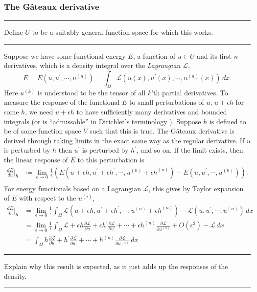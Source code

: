 \documentclass[11pt,a4paper]{memoir}
\newcommand{\pr}{\prime}
\newcommand{\fancyL}{\mathcal{L}}
\newcommand{\todo}[1]{\vskip 0.1in \hrule \vskip 0.03in {#1} \vskip 0.03in \hrule \vskip 0.1in}
\begin{document}
\subsubsection{The G\^ateaux derivative}
\todo{Define $U$ to be a suitably general function space for which this works.}

Suppose we have some functional energy $E$, a function of $u \in U$ and its first $n$ derivatives,
which is a density integral over the \textit{Lagrangian} $\fancyL$,
    $$E = E(u, u^\prime, \cdots, u^{(n)}) = \int_\Omega \fancyL(u(x),u^\prime(x),\cdots,u^{(n)}(x))\,dx.$$
Here $u^{(k)}$ is understood to be the tensor of all $k$'th partial derivatives. To measure
the response of the functional $E$ to small perturbations of $u$, $u + \epsilon h$ for some $h$, we need $u + \epsilon h$ to
have sufficiently many derivatives and bounded integrals (or is ``admissable'' in Dirichlet's terminology \cite{dirichlet_principle}). Suppose $h$ is defined to be of some function space $V$ such that
this is true.
The G\^ateaux derivative is derived through taking limits in the exact same way as the regular derivative.
If $u$ is perturbed by $h$ then $u^\prime$ is perturbed by $h^\prime$, and so on. If the limit exists, then the
linear response of $E$ to this perturbation is
\begin{align*}
    \frac{dE}{du}\Big|_h &\coloneqq \lim_{\epsilon \rightarrow 0} \frac{1}{\epsilon} \left(E(u + \epsilon h, u^\prime + \epsilon h^\pr, \cdots, u^{(n)} + \epsilon h^{(n)})
        - E(u, u^\pr, \cdots, u^{(n)})\right).\\
\end{align*}
For energy functionals based on a Lagrangian $\fancyL$, this gives by Taylor expansion of $E$ with respect to the $u^{(i)}$,
\begin{equation}\label{gateaux_lagrangian}
\begin{split}
    \frac{dE}{du}\Big|_h &=
        \lim_{\epsilon \rightarrow 0} \frac{1}{\epsilon} \int_\Omega \mathcal{L}(u +\epsilon h, u^\pr + \epsilon h^\pr,\cdots, u^{(n)} + \epsilon h^{(n)})
            - \mathcal{L}(u, u^\pr,\cdots, u^{(n)})\, dx \\
        &= \lim_{\epsilon \rightarrow 0} \frac{1}{\epsilon}
                \int_\Omega \mathcal{L}
                    + \epsilon h\frac{\partial\mathcal{L}}{\partial u}
                    + \epsilon h^\pr\frac{\partial\mathcal{L}}{\partial u^\pr}
                    +\cdots
                    + \epsilon h^{(n)}\frac{\partial\mathcal{L}}{\partial u^{(n)}} + O(\epsilon^2)
                    - \mathcal{L}\,dx\\
        &= \int_\Omega h\frac{\partial\mathcal{L}}{\partial u} + h^\prime\frac{\partial\fancyL}{\partial u^\prime} + \cdots + h^{(n)}\frac{\partial\fancyL}{\partial u^{(n)}}\,dx
\end{split}
\end{equation}
\todo{Explain why this result is expected, as it just adds up the responses of the density.}
\end{document}
